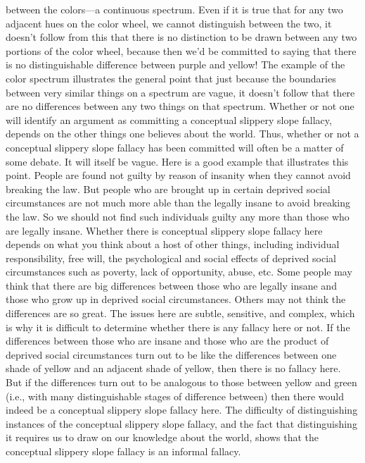 between the colors—a continuous spectrum. Even if it is true that for any two
adjacent hues on the color wheel, we cannot distinguish between the two, it
doesn't follow from this that there is no distinction to be drawn between any two
portions of the color wheel, because then we'd be committed to saying that
there is no distinguishable difference between purple and yellow! The example
of the color spectrum illustrates the general point that just because the
boundaries between very similar things on a spectrum are vague, it doesn't
follow that there are no differences between any two things on that spectrum.
Whether or not one will identify an argument as committing a conceptual
slippery slope fallacy, depends on the other things one believes about the world.
Thus, whether or not a conceptual slippery slope fallacy has been committed will
often be a matter of some debate. It will itself be vague. Here is a good
example that illustrates this point.
People are found not guilty by reason of insanity when they cannot avoid
breaking the law. But people who are brought up in certain deprived
social circumstances are not much more able than the legally insane to
avoid breaking the law. So we should not find such individuals guilty any
more than those who are legally insane.
Whether there is conceptual slippery slope fallacy here depends on what you
think about a host of other things, including individual responsibility, free will,
the psychological and social effects of deprived social circumstances such as
poverty, lack of opportunity, abuse, etc. Some people may think that there are
big differences between those who are legally insane and those who grow up in
deprived social circumstances. Others may not think the differences are so
great. The issues here are subtle, sensitive, and complex, which is why it is
difficult to determine whether there is any fallacy here or not. If the differences
between those who are insane and those who are the product of deprived social
circumstances turn out to be like the differences between one shade of yellow
and an adjacent shade of yellow, then there is no fallacy here. But if the
differences turn out to be analogous to those between yellow and green (i.e.,
with many distinguishable stages of difference between) then there would
indeed be a conceptual slippery slope fallacy here. The difficulty of
distinguishing instances of the conceptual slippery slope fallacy, and the fact
that distinguishing it requires us to draw on our knowledge about the world,
shows that the conceptual slippery slope fallacy is an informal fallacy.


